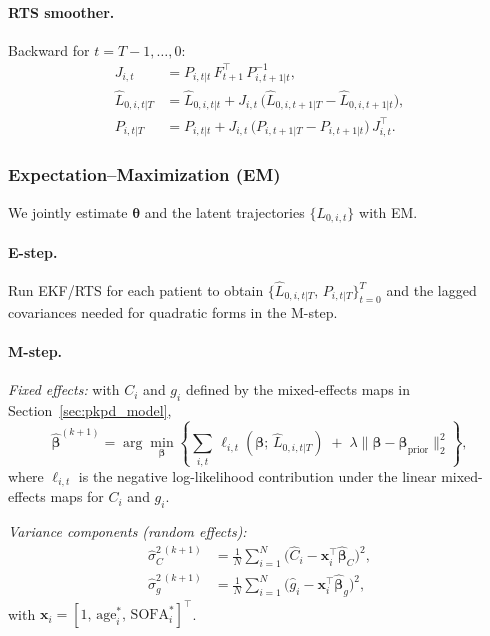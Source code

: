 \paragraph{RTS smoother.}
Backward for $t=T-1,\dots,0$:
\begin{align}
J_{i,t} &= P_{i,t|t}\, F_{t+1}^\top \, P_{i,t+1|t}^{-1}, \\
\hat L_{0,i,t|T} &= \hat L_{0,i,t|t} + J_{i,t}\,\big(\hat L_{0,i,t+1|T} - \hat L_{0,i,t+1|t}\big), \\
P_{i,t|T} &= P_{i,t|t} + J_{i,t}\,\big(P_{i,t+1|T} - P_{i,t+1|t}\big)\, J_{i,t}^\top.
\end{align}

\subsubsection*{Expectation--Maximization (EM)}
We jointly estimate $\boldsymbol{\theta}$ and the latent trajectories $\{L_{0,i,t}\}$ with EM.

\paragraph{E-step.}
Run EKF/RTS for each patient to obtain $\{\hat L_{0,i,t|T},\, P_{i,t|T}\}_{t=0}^T$ and the lagged covariances needed for quadratic forms in the M-step.

\paragraph{M-step.}
\emph{Fixed effects:} with $C_i$ and $g_i$ defined by the mixed-effects maps in Section~\ref{sec:pkpd_model},
\begin{equation}
\hat{\boldsymbol{\beta}}^{(k+1)} 
= \arg\min_{\boldsymbol{\beta}}
\left\{
\sum_{i,t}\, \ell_{i,t}(\boldsymbol{\beta};\, \hat L_{0,i,t|T}) \;+\; 
\lambda \big\|\boldsymbol{\beta}-\boldsymbol{\beta}_{\text{prior}}\big\|_2^2
\right\},
\end{equation}
where $\ell_{i,t}$ is the negative log-likelihood contribution under the linear mixed-effects maps for $C_i$ and $g_i$.

\emph{Variance components (random effects):}
\begin{align}
\hat\sigma_C^{2\,(k+1)} &= \frac{1}{N} \sum_{i=1}^N \big(\hat C_i - \mathbf{x}_i^\top \hat{\boldsymbol{\beta}}_C\big)^2, \\
\hat\sigma_g^{2\,(k+1)} &= \frac{1}{N} \sum_{i=1}^N \big(\hat g_i - \mathbf{x}_i^\top \hat{\boldsymbol{\beta}}_g\big)^2,
\end{align}
with $\mathbf{x}_i=[1,\,\mathrm{age}_i^*,\,\mathrm{SOFA}_i^*]^\top$.

